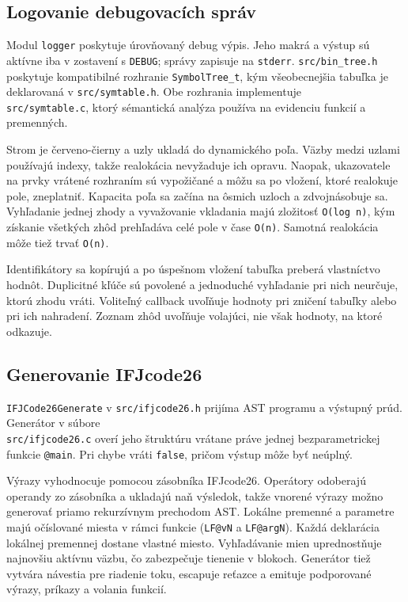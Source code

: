 \documentclass[11pt,a4paper]{article}
\begin{document}
  \subsection{Logovanie debugovacích správ}

  Modul \texttt{logger} poskytuje úrovňovaný debug výpis. Jeho makrá a výstup
  sú aktívne iba v zostavení s \texttt{DEBUG}; správy zapisuje na \texttt{stderr}.
  \texttt{src/bin\_tree.h} poskytuje kompatibilné rozhranie
  \texttt{SymbolTree\_t}, kým všeobecnejšia tabuľka je deklarovaná v
  \texttt{src/symtable.h}. Obe rozhrania implementuje
  \\\texttt{src/symtable.c}, ktorý sémantická analýza používa na evidenciu
  funkcií a premenných.

  Strom je červeno-čierny a uzly ukladá do dynamického poľa. Väzby medzi
  uzlami používajú indexy, takže realokácia nevyžaduje ich opravu. Naopak,
  ukazovatele na prvky vrátené rozhraním sú vypožičané a môžu sa po vložení,
  ktoré realokuje pole, zneplatniť. Kapacita poľa sa začína na ôsmich uzloch
  a zdvojnásobuje sa. Vyhľadanie jednej zhody a vyvažovanie vkladania majú
  zložitosť \texttt{O(log n)}, kým získanie všetkých zhôd prehľadáva celé
  pole v čase \texttt{O(n)}. Samotná realokácia môže tiež trvať
  \texttt{O(n)}.

  Identifikátory sa kopírujú a po úspešnom vložení tabuľka preberá vlastníctvo
  hodnôt.
  Duplicitné kľúče sú povolené a jednoduché vyhľadanie pri nich neurčuje,
  ktorú zhodu vráti. Voliteľný callback uvoľňuje hodnoty pri zničení tabuľky
  alebo pri ich nahradení. Zoznam zhôd uvoľňuje volajúci, nie však hodnoty,
  na ktoré odkazuje.

  \subsection{Generovanie IFJcode26}

  \texttt{IFJCode26Generate} v \texttt{src/ifjcode26.h} prijíma AST programu
  a výstupný prúd. Generátor v súbore\\ \texttt{src/ifjcode26.c} overí jeho štruktúru vrátane práve jednej bezparametrickej funkcie \texttt{@main}.
  Pri chybe vráti \texttt{false}, pričom výstup môže byť neúplný.

  Výrazy vyhodnocuje pomocou zásobníka IFJcode26. Operátory odoberajú
  operandy zo zásobníka a ukladajú naň výsledok, takže vnorené výrazy možno
  generovať priamo rekurzívnym prechodom AST. Lokálne premenné a parametre
  majú očíslované miesta v rámci funkcie (\texttt{LF@vN} a
  \texttt{LF@argN}). Každá deklarácia lokálnej premennej dostane vlastné
  miesto. Vyhľadávanie mien uprednostňuje najnovšiu aktívnu väzbu, čo
  zabezpečuje tienenie v blokoch. Generátor tiež vytvára návestia pre riadenie
  toku, escapuje reťazce a emituje podporované výrazy, príkazy a volania
  funkcií.
\end{document}
